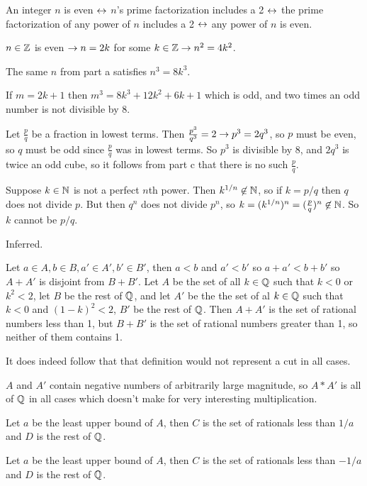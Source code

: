 \documentclass[11pt, oneside]{article}   	%
\begin{document}
\ee
\item An integer $n$ is even $\leftrightarrow$ $n$'s prime factorization includes a 2 $\leftrightarrow$ the prime factorization of any power of $n$ includes a 2 $\leftrightarrow$ any power of $n$ is even.
\item \be
\item $n \in \mathbb{Z}$ is even $\rightarrow n = 2k$ for some $k \in \mathbb{Z} \rightarrow n^2 = 4k^2$.
\item The same $n$ from part a satisfies $n^3 = 8k^3$.
\item If $m=2k+1$ then $m^3 = 8k^3 + 12k^2 + 6k + 1$ which is odd, and two times an odd number is not divisible by 8.
\item Let $\frac{p}{q}$ be a fraction in lowest terms. Then $\frac{p^3}{q^3} = 2 \rightarrow p^3 = 2q^3$, so $p$ must be even, so $q$ must be odd since $\frac{p}{q}$ was in lowest terms. So $p^3$ is divisible by 8, and $2q^3$ is twice an odd cube, so it follows from part c that there is no such $\frac{p}{q}$.
\ee
\item \be 
\item Suppose $k \in \mathbb{N}$ is not a perfect $n$th power. Then $k^{1/n} \not \in \mathbb{N}$, so if $k = p/q$ then $q$ does not divide $p$. But then $q^n$ does not divide $p^n$, so $k = (k^{1/n})^n = (\frac{p}{q})^n  \not \in \mathbb{N}$. So $k$ cannot be $p/q$.
\item Inferred.
\ee
\item \be
\item Let $a \in A, b \in B, a' \in A', b' \in B'$, then $a < b$ and $a' < b'$ so $a + a' < b + b'$ so $A + A' $ is disjoint from $B + B'$. Let $A$ be the set of all $k \in \mathbb{Q}$ such that $k < 0$ or $k^2 < 2$, let $B$ be the rest of $\mathbb{Q}$, and let $A'$ be the the set of al $k \in \mathbb{Q}$ such that $k < 0$ and $(1-k)^2 < 2$, $B'$ be the rest of $\mathbb{Q}$. Then $A + A'$ is the set of rational numbers less than 1, but $B + B'$ is the set of rational numbers greater than 1, so neither of them contains 1.  
\item It does indeed follow that that definition would not represent a cut in all cases.
\item $A$ and $A'$ contain negative numbers of arbitrarily large magnitude, so $A * A'$ is all of $\mathbb{Q}$ in all cases which doesn't make for very interesting multiplication.
\ee
\item \be
\item Let $a$ be the least upper bound of $A$, then $C$ is the set of rationals less than $1/a$ and $D$ is the rest of $\mathbb{Q}$.
\item Let $a$ be the least upper bound of $A$, then $C$ is the set of rationals less than $-1/a$ and $D$ is the rest of $\mathbb{Q}$.
\end{document}
